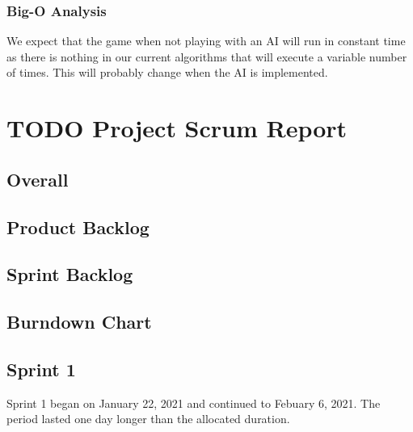 \documentclass[11pt]{article}
\begin{document}
\subsubsection{Big-O Analysis}
\label{sec:orgcff1387}
We expect that the game when not playing with an AI will run in
constant time as there is nothing in our current algorithms that
will execute a variable number of times. This will probably change
when the AI is implemented.

\section{{\bfseries\sffamily TODO} Project Scrum Report}
\label{sec:orgca187da}
\subsection{Overall}
\label{sec:orgb814599}
\subsection{Product Backlog}
\label{sec:orgf4b8c36}
\subsection{Sprint Backlog}
\label{sec:orgc6f7c58}
\subsection{Burndown Chart}
\label{sec:org4b11608}
\subsection{Sprint 1}
\label{sec:org3e100cc}
Sprint 1 began on January 22, 2021 and continued to Febuary
6, 2021. The period lasted one day longer than the allocated duration.
\end{document}
